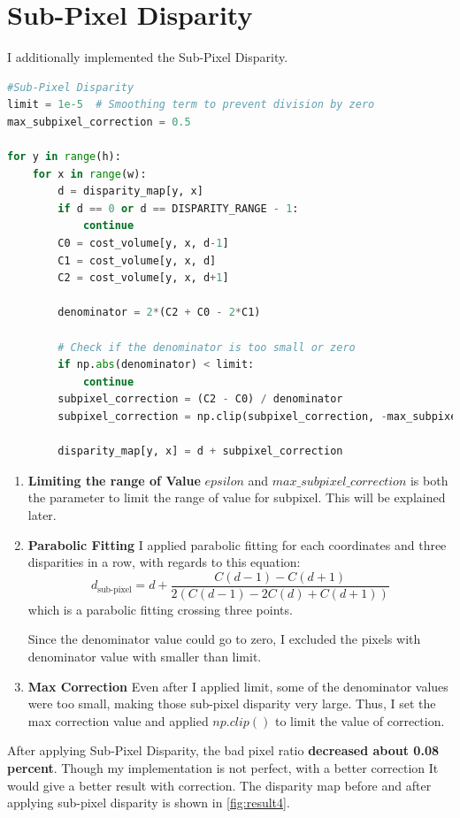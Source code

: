 \section*{Sub-Pixel Disparity}
I additionally implemented the Sub-Pixel Disparity.
\begin{lstlisting}[language=python]
#Sub-Pixel Disparity
limit = 1e-5  # Smoothing term to prevent division by zero
max_subpixel_correction = 0.5

for y in range(h):
    for x in range(w):
        d = disparity_map[y, x]
        if d == 0 or d == DISPARITY_RANGE - 1:
            continue
        C0 = cost_volume[y, x, d-1]
        C1 = cost_volume[y, x, d]
        C2 = cost_volume[y, x, d+1]

        denominator = 2*(C2 + C0 - 2*C1)
        
        # Check if the denominator is too small or zero
        if np.abs(denominator) < limit:
            continue
        subpixel_correction = (C2 - C0) / denominator
        subpixel_correction = np.clip(subpixel_correction, -max_subpixel_correction, max_subpixel_correction)

        disparity_map[y, x] = d + subpixel_correction
\end{lstlisting}
\begin{enumerate}
    \item \textbf{Limiting the range of Value} 
    $epsilon$ and $max\_subpixel\_correction$ is both the parameter to limit the range of value for subpixel. This will be explained later.
    \item \textbf{Parabolic Fitting} I applied parabolic fitting for each coordinates and three disparities in a row, with regards to this equation:
    \[
d_{\text{sub-pixel}} = d + \frac{C(d-1) - C(d+1)}{2(C(d-1) - 2C(d) + C(d+1))}
\]
which is a parabolic fitting crossing three points.

Since the denominator value could go to zero, I excluded the pixels with denominator value with smaller than limit. 
    \item\textbf{Max Correction} Even after I applied limit, some of the denominator values were too small, making those sub-pixel disparity very large. Thus, I set the max correction value and applied $np.clip()$ to limit the value of correction.

\end{enumerate}
After applying Sub-Pixel Disparity, the bad pixel ratio \textbf{decreased about 0.08 percent}. Though my implementation is not perfect, with a better correction It would give a better result with correction. The disparity map before and after applying sub-pixel disparity is shown in \ref{fig:result4}.
